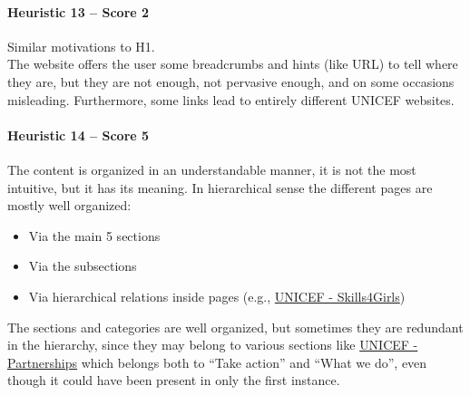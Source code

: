 \paragraph*{Heuristic 13 – Score 2}
Similar motivations to H1.\\
The website offers the user some breadcrumbs and hints (like URL) to tell where they are, but they are not enough, not pervasive enough, and on some occasions misleading. Furthermore, some links lead to entirely different UNICEF websites.

\paragraph*{Heuristic 14 – Score 5}
The content is organized in an understandable manner, it is not the most intuitive, but it has its meaning. In hierarchical sense the different pages are mostly well organized:
\begin{itemize}
	\item Via the main 5 sections
	\item Via the subsections
	\item Via hierarchical relations inside pages (e.g., \href{https://www.unicef.org/gender-equality/skills4girls}{UNICEF - Skills4Girls})
\end{itemize}
The sections and categories are well organized, but sometimes they are redundant in the hierarchy, since they may belong to various sections like \href{https://www.unicef.org/partnerships}{UNICEF - Partnerships} which belongs both to “Take action” and “What we do”, even though it could have been present in only the first instance.

